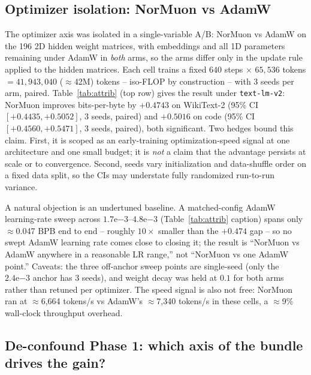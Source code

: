 \subsection{Optimizer isolation: NorMuon vs AdamW}\label{sec:pretrain-optimizer}

The optimizer axis was isolated in a single-variable A/B: NorMuon
\citep{li2025normuon} vs AdamW \citep{loshchilov2017decoupled} on the 196 2D
hidden weight matrices, with embeddings and all 1D parameters remaining under
AdamW in \emph{both} arms, so the arms differ only in the update rule applied
to the hidden matrices. Each cell trains a fixed $640$ steps $\times$
$65{,}536$ tokens $= 41{,}943{,}040$ ($\approx$42M) tokens -- iso-FLOP by
construction -- with 3 seeds per arm, paired. Table~\ref{tab:attrib} (top row)
gives the result under \texttt{text-lm-v2}: NorMuon improves bits-per-byte by
$+0.4743$ on WikiText-2 (95\% CI $[+0.4435, +0.5052]$, 3 seeds, paired) and
$+0.5016$ on code (95\% CI $[+0.4560, +0.5471]$, 3 seeds, paired), both
significant. Two hedges bound this claim. First, it is scoped as an
early-training optimization-speed signal at one architecture and one small
budget; it is \emph{not} a claim that the advantage persists at scale or to
convergence. Second, seeds vary initialization and data-shuffle order on a
fixed data split, so the CIs may understate fully randomized run-to-run
variance.



A natural objection is an undertuned baseline. A matched-config AdamW
learning-rate sweep across $1.7\mathrm{e}{-3}$--$4.8\mathrm{e}{-3}$
(Table~\ref{tab:attrib} caption) spans only $\approx$0.047 BPB end to end --
roughly $10\times$ smaller than the $+0.474$ gap -- so no swept AdamW learning
rate comes close to closing it; the result is ``NorMuon vs AdamW anywhere in a
reasonable LR range,'' not ``NorMuon vs one AdamW point.'' Caveats: the three
off-anchor sweep points are single-seed (only the $2.4\mathrm{e}{-3}$ anchor
has 3 seeds), and weight decay was held at $0.1$ for both arms rather than
retuned per optimizer. The speed signal is also not free: NorMuon ran at
$\approx$6{,}664 tokens/s vs AdamW's $\approx$7{,}340 tokens/s in these cells,
a $\approx$9\% wall-clock throughput overhead.

\subsection{De-confound Phase 1: which axis of the bundle drives the gain?}\label{sec:pretrain-p1}

